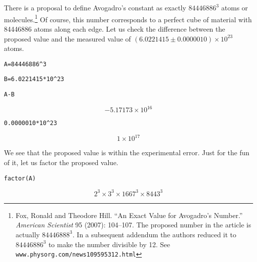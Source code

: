 \section{}

There is a proposal to define Avogadro's constant as exactly $84446886^3$
atoms or molecules.\footnote{Fox, Ronald and Theodore Hill.
``An Exact Value for Avogadro's Number.''
{\it American Scientist} 95 (2007): 104--107.
The proposed number in the article is actually $84446888^3$.
In a subsequent addendum the authors reduced it to $84446886^3$ to make the
number divisible by 12. See {\tt www.physorg.com/news109595312.html}}
Of course, this number corresponds to a perfect cube of material with 84446886
atoms along each edge.
Let us check the difference between the proposed value and the measured value
of $(6.0221415\pm0.0000010)\times10^{23}$ atoms.

\medskip
\verb$A=84446886^3$

\verb$B=6.0221415*10^23$

\verb$A-B$

$$-5.17173\times10^{16}$$

\verb$0.0000010*10^23$

$$1\times10^{17}$$

\medskip
\noindent
We see that the proposed value is within the experimental error.
Just for the fun of it, let us factor the proposed value.

\medskip
\verb$factor(A)$

$$2^3\times3^3\times1667^3\times8443^3$$

